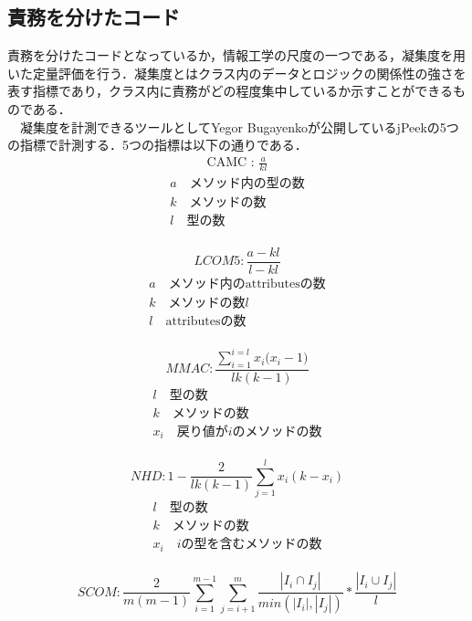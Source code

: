 \documentclass[12pt, a4paper]{jreport}
\begin{document}
\subsection{責務を分けたコード}
責務を分けたコードとなっているか，情報工学の尺度の一つである，凝集度を用いた定量評価を行う．凝集度とはクラス内のデータとロジックの関係性の強さを表す指標であり，クラス内に責務がどの程度集中しているか示すことができるものである．
\\　凝集度を計測できるツールとしてYegor Bugayenko\cite{jPeek}が公開しているjPeekの5つの指標で計測する．5つの指標は以下の通りである．
\\
\begin{gather}
\text{CAMC : }
\frac{a}{kl}
\end{gather}
\begin{gather*}
a\text{　メソッド内の型の数}
\\k\text{　メソッドの数}
\\l\text{　型の数}
\end{gather*}
\\
\begin{equation}
LCOM5:
\frac{a-kl}{l-kl}
\end{equation}
\begin{gather*}
a\text{　メソッド内のattributesの数}
\\k\text{　メソッドの数}
l\\l\text{　attributesの数}
\end{gather*}
\\
\begin{equation}
MMAC:
\frac{\sum^{i=l}_{i=1}{{x}_{i}{({x}_{i}-1})}}{lk(k-1)}
\end{equation}
\begin{gather*}
l\text{　型の数}
\\k\text{　メソッドの数}
\\{x}_{i}\text{　戻り値が}i\text{のメソッドの数}
\end{gather*}
\\
\begin{equation}
NHD:
1-\frac{2}{lk(k-1)}\sum^{l}_{j=1}{x}_{i}{(k-{x}_{i})}
\end{equation}
\begin{gather*}
l\text{　型の数}
\\k\text{　メソッドの数}
\\{x}_{i}\text{　}i\text{の型を含むメソッドの数}
\end{gather*}
\\
\begin{equation}
SCOM:
\frac{2}{m(m-1)}\sum^{m-1}_{i=1}\sum^{m}_{j=i+1}\frac{|{I}_{i}\cap{I}_{j}|}{min(|{I}_{i}|, |{I}_{j}|)}*\frac{|{I}_{i}\cup{I}_{j}|}{l}
\end{equation}
\end{document}
